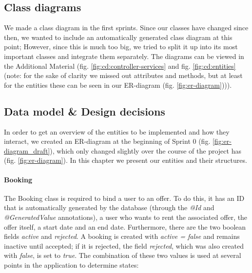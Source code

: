 \subsection{Class diagrams}
We made a class diagram in the first sprints. Since our classes have changed since then, we wanted to include an automatically generated class diagram at this point; However, since this is much too big, we tried to split it up into its most important classes and integrate them separately. The diagrams can be viewed in the Additional Material (fig. \ref{fig:cd:controller-services} and fig. \ref{fig:cd:entities} (note: for the sake of clarity we missed out attributes and methods, but at least for the entities these can be seen in our ER-diagram (fig. \ref{fig:er-diagram}))).

\subsection{Data model \& Design decisions}
\label{subsec:datamodel-and-design}
In order to get an overview of the entities to be implemented and how they interact, we created an ER-diagram at the beginning of Sprint 0 (fig. \ref{fig:er-diagram_draft}), which only changed slightly over the course of the project has (fig. \ref{fig:er-diagram}). In this chapter we present our entities and their structures.

\paragraph{Booking}
The Booking class is required to bind a user to an offer. To do this, it has an ID that is automatically generated by the database (through the \textit{@Id} and \textit{@GeneratedValue} annotations), a user who wants to rent the associated offer, the offer itself, a start date and an end date. Furthermore, there are the two boolean fields \textit{active} and \textit{rejected}. A booking is created with \textit{active = false} and remains inactive until accepted; if it is rejected, the field \textit{rejected}, which was also created with \textit{false}, is set to \textit{true}. The combination of these two values is used at several points in the application to determine states:

